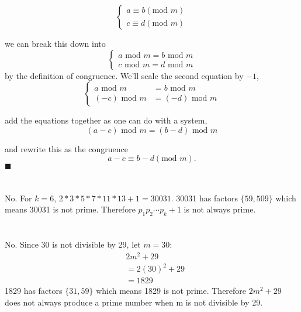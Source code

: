 \documentclass{article}
\begin{document}
\begin{equation*}
    \begin{cases}
            a \equiv b (\text{mod } m) \\
            c \equiv d (\text{mod } m)
    \end{cases}
\end{equation*}

we can break this down into
\begin{equation*}
    \begin{cases}
        a \text{ mod } m = b \text{ mod } m \\
        c \text{ mod } m = d \text{ mod } m
    \end{cases}
\end{equation*}
by the definition of congruence. We'll scale the second equation by $-1$,
\begin{equation*}
    \begin{cases}
    a \text{ mod } m &= b \text{ mod } m \\
    (-c) \text{ mod } m &= (-d) \text{ mod } m
\end{cases}
\end{equation*}

add the equations together as one can do with a system,
\begin{equation*}
    (a-c)\text{ mod }m = (b-d)\text{ mod }m
\end{equation*}

and rewrite this as the congruence
\begin{equation*}
    a-c\equiv b-d (\text{mod } m).
\end{equation*}
$\blacksquare$

\section{}
No. For $k=6$, $2*3*5*7*11*13 +1 = 30031$.
30031 has factors $\{59, 509\}$ which means 30031 is not prime.
Therefore $p_1p_2\cdots p_k +1$ is not always prime.

\section{}
No. Since 30 is not divisible by 29, let $m=30$:
\begin{align*}
    & 2m^2 + 29 \\
    &= 2(30)^2 + 29 \\
    &= 1829
\end{align*}
1829 has factors $\{ 31, 59 \}$ which means 1829 is not prime. Therefore $2m^2 + 29$ does not always produce a prime number when m is not divisible by 29.
\end{document}
